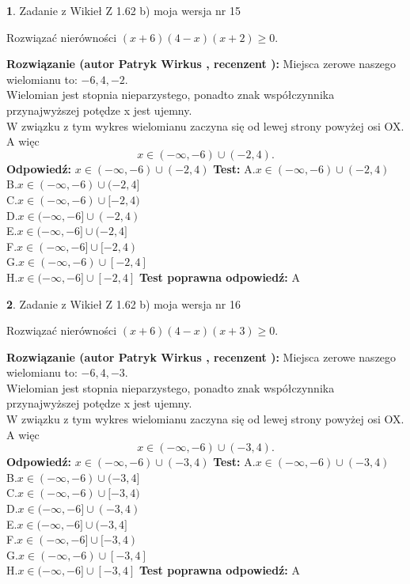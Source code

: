 \documentclass[12pt, a4paper]{article}
\theoremstyle{definition} %
\newtheorem{zad}{}
\newcommand{\zadStart}[1]{\begin{zad}#1\newline}
\newcommand{\zadStop}{\end{zad}}
\newcommand{\rozwStart}[2]{\noindent \textbf{Rozwiązanie (autor #1 , recenzent #2): }\newline}
\newcommand{\rozwStop}{\newline}
\newcommand{\odpStart}{\noindent \textbf{Odpowiedź:}\newline}
\newcommand{\odpStop}{\newline}
\newcommand{\testStart}{\noindent \textbf{Test:}\newline}
\newcommand{\testStop}{\newline}
\newcommand{\kluczStart}{\noindent \textbf{Test poprawna odpowiedź:}\newline}
\newcommand{\kluczStop}{\newline}
\begin{document}
\zadStart{Zadanie z Wikieł Z 1.62 b) moja wersja nr 15}

Rozwiązać nierówności $(x+6)(4-x)(x+2)\ge0$.
\zadStop
\rozwStart{Patryk Wirkus}{}
Miejsca zerowe naszego wielomianu to: $-6, 4, -2$.\\
Wielomian jest stopnia nieparzystego, ponadto znak współczynnika przy\linebreak najwyższej potędze x jest ujemny.\\ W związku z tym wykres wielomianu zaczyna się od lewej strony powyżej osi OX. A więc $$x \in (-\infty,-6) \cup (-2,4).$$
\rozwStop
\odpStart
$x \in (-\infty,-6) \cup (-2,4)$
\odpStop
\testStart
A.$x \in (-\infty,-6) \cup (-2,4)$\\
B.$x \in (-\infty,-6) \cup (-2,4]$\\
C.$x \in (-\infty,-6) \cup [-2,4)$\\
D.$x \in (-\infty,-6] \cup (-2,4)$\\
E.$x \in (-\infty,-6] \cup (-2,4]$\\
F.$x \in (-\infty,-6] \cup [-2,4)$\\
G.$x \in (-\infty,-6) \cup [-2,4]$\\
H.$x \in (-\infty,-6] \cup [-2,4]$
\testStop
\kluczStart
A
\kluczStop



\zadStart{Zadanie z Wikieł Z 1.62 b) moja wersja nr 16}

Rozwiązać nierówności $(x+6)(4-x)(x+3)\ge0$.
\zadStop
\rozwStart{Patryk Wirkus}{}
Miejsca zerowe naszego wielomianu to: $-6, 4, -3$.\\
Wielomian jest stopnia nieparzystego, ponadto znak współczynnika przy\linebreak najwyższej potędze x jest ujemny.\\ W związku z tym wykres wielomianu zaczyna się od lewej strony powyżej osi OX. A więc $$x \in (-\infty,-6) \cup (-3,4).$$
\rozwStop
\odpStart
$x \in (-\infty,-6) \cup (-3,4)$
\odpStop
\testStart
A.$x \in (-\infty,-6) \cup (-3,4)$\\
B.$x \in (-\infty,-6) \cup (-3,4]$\\
C.$x \in (-\infty,-6) \cup [-3,4)$\\
D.$x \in (-\infty,-6] \cup (-3,4)$\\
E.$x \in (-\infty,-6] \cup (-3,4]$\\
F.$x \in (-\infty,-6] \cup [-3,4)$\\
G.$x \in (-\infty,-6) \cup [-3,4]$\\
H.$x \in (-\infty,-6] \cup [-3,4]$
\testStop
\kluczStart
A
\kluczStop
\end{document}
